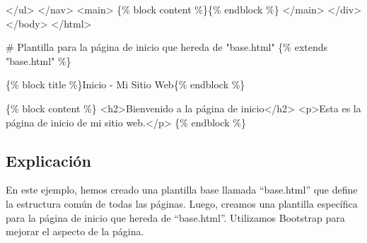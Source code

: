 \documentclass[
  a4paper,
  DIV=11,
  numbers=noendperiod,
  onepage,
  openany]{scrreprt}
\newenvironment{Shaded}{\begin{snugshade}}{\end{snugshade}}
\newcommand{\DataTypeTok}[1]{\textcolor[rgb]{0.68,0.00,0.00}{#1}}
\newcommand{\KeywordTok}[1]{\textcolor[rgb]{0.00,0.23,0.31}{#1}}
\newcommand{\NormalTok}[1]{\textcolor[rgb]{0.00,0.23,0.31}{#1}}
\newcommand{\OperatorTok}[1]{\textcolor[rgb]{0.37,0.37,0.37}{#1}}
\begin{document}
\begin{Shaded}
\begin{Highlighting}[]
            \OperatorTok{\textless{}/}\NormalTok{ul}\OperatorTok{\textgreater{}}
        \OperatorTok{\textless{}/}\NormalTok{nav}\OperatorTok{\textgreater{}}
        \OperatorTok{\textless{}}\NormalTok{main}\OperatorTok{\textgreater{}}
\NormalTok{            \{}\OperatorTok{\%}\NormalTok{ block content }\OperatorTok{\%}\NormalTok{\}\{}\OperatorTok{\%}\NormalTok{ endblock }\OperatorTok{\%}\NormalTok{\}}
        \OperatorTok{\textless{}/}\NormalTok{main}\OperatorTok{\textgreater{}}
    \OperatorTok{\textless{}/}\NormalTok{div}\OperatorTok{\textgreater{}}
\OperatorTok{\textless{}/}\NormalTok{body}\OperatorTok{\textgreater{}}
\OperatorTok{\textless{}/}\NormalTok{html}\OperatorTok{\textgreater{}}
\end{Highlighting}
\end{Shaded}

\begin{Shaded}
\begin{Highlighting}[]
\NormalTok{\# Plantilla para la página de inicio que hereda de "base.html"}
\NormalTok{\{\% extends "base.html" \%\}}

\NormalTok{\{\% block title \%\}Inicio {-} Mi Sitio Web\{\% endblock \%\}}

\NormalTok{\{\% block content \%\}}
    \DataTypeTok{\textless{}}\KeywordTok{h2}\DataTypeTok{\textgreater{}}\NormalTok{Bienvenido a la página de inicio}\DataTypeTok{\textless{}/}\KeywordTok{h2}\DataTypeTok{\textgreater{}}
    \DataTypeTok{\textless{}}\KeywordTok{p}\DataTypeTok{\textgreater{}}\NormalTok{Esta es la página de inicio de mi sitio web.}\DataTypeTok{\textless{}/}\KeywordTok{p}\DataTypeTok{\textgreater{}}
\NormalTok{\{\% endblock \%\}}
\end{Highlighting}
\end{Shaded}

\subsection{Explicación}\label{explicaciuxf3n-49}

En este ejemplo, hemos creado una plantilla base llamada ``base.html''
que define la estructura común de todas las páginas. Luego, creamos una
plantilla específica para la página de inicio que hereda de
``base.html''. Utilizamos Bootstrap para mejorar el aspecto de la
página.
\end{document}
